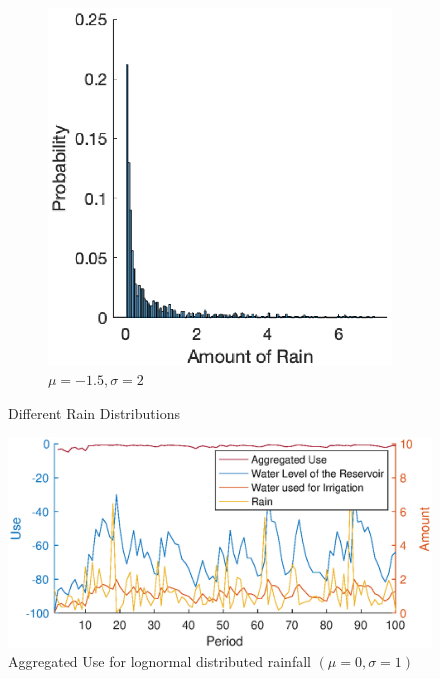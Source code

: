 \documentclass[12pt, a4paper, oneside]{article}
\begin{document}
\begin{figure}
\begin{subfigure}{.5\textwidth}
		\includegraphics[width=1\textwidth]{figures/rainfall-more-volatile.eps}
		\caption{$\mu=-1.5, \sigma=2$}
		\label{fig:rainfall-changed}
	\end{subfigure}
	\caption{Different Rain Distributions}
	\label{fig:rain-distributions}
\end{figure}
\newpage
\begin{figure}[ht]
	\includegraphics[width=1\textwidth]{figures/aggregated-use-rainfall-default.eps}
	\caption{Aggregated Use for lognormal distributed rainfall $(\mu=0, \sigma=1)$}
	\label{fig:aggregated-use-rainfall-default}
\end{figure}
\end{document}
